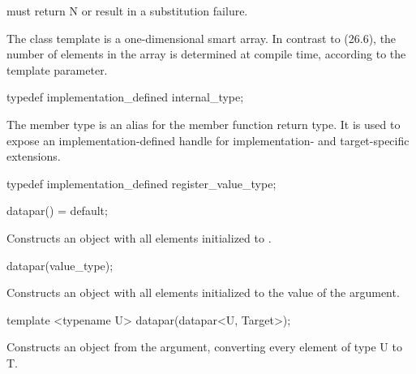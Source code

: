 \begin{wgText}
\begin{itemdescr}
    \pnum
     must return \code N or result in a substitution failure.
  \end{itemdescr}

  

  \pnum The class template \datapar{} is a one-dimensional smart array.
  In contrast to  (26.6), the number of elements in the array is determined at compile time, according to the  template parameter.

  \begin{itemdecl}
typedef implementation_defined internal_type;
  \end{itemdecl}
  \begin{itemdescr}
    \pnum
    The  member type is an alias for the  member function return type.
    It is used to expose an implementation-defined handle for implementation- and target-specific extensions.
  \end{itemdescr}

  \begin{itemdecl}
typedef implementation_defined register_value_type;
  \end{itemdecl}
  \begin{itemdescr}
  \end{itemdescr}

  \begin{itemdecl}
datapar() = default;
  \end{itemdecl}
  \begin{itemdescr}
    \pnum
    \effects
    Constructs an object with all elements initialized to .
  \end{itemdescr}

  \begin{itemdecl}
datapar(value_type);
  \end{itemdecl}
  \begin{itemdescr}
    \pnum
    \effects
    Constructs an object with all elements initialized to the value of the argument.
  \end{itemdescr}

  \begin{itemdecl}
template <typename U> datapar(datapar<U, Target>);
  \end{itemdecl}
  \begin{itemdescr}
    \pnum
    \effects
    Constructs an object from the argument, converting every element of type \type U to \type T.
  \end{itemdescr}


\end{wgText}
